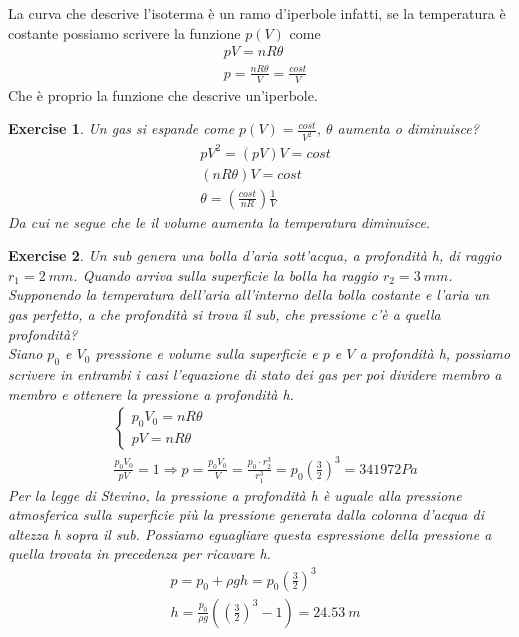 \documentclass[10pt,a4paper]{article}
\newtheorem{exercise}{Exercise}
\begin{document}
\FloatBarrier
 La curva che descrive l'isoterma è un ramo d'iperbole infatti, se la temperatura è costante possiamo scrivere la funzione $p(V)$ come
 \begin{align*} 
 	&p V  = nR\theta \\
 	&p = \frac{n R \theta}{V} = \frac{cost}{V}
 \end{align*} 
Che è proprio la funzione che descrive un'iperbole.
\begin{exercise}
 Un gas si espande come $p(V) = \frac{cost}{V^2}$, $\theta$ aumenta o diminuisce? 
 \begin{align*} 
 	&p V^2 = \left(p V \right) V = cost\\
 	&\left(n R \theta\right) V = cost\\
 	& \theta = \left(\frac{cost}{n R}\right)\frac{1}{V}
 \end{align*}  
Da cui ne segue che le il volume aumenta la temperatura diminuisce.
\end{exercise}
\begin{exercise}
Un sub genera una bolla d'aria sott'acqua, a profondità h, di raggio $r_1 = 2\ mm$. Quando arriva sulla superficie la bolla ha raggio $r_2 = 3\ mm$. Supponendo la temperatura dell'aria all'interno della bolla costante e l'aria un gas perfetto, a che profondità si trova il sub, che pressione c'è a quella profondità?\\
Siano $p_0$ e $V_0$ pressione e volume sulla superficie e $p$ e $V$ a profondità h, possiamo scrivere in entrambi i casi l'equazione di stato dei gas per poi dividere membro a membro e ottenere la pressione a profondità h. 
\begin{align*} 
&\begin{cases}
p_0 V_0 = n R \theta\\
pV = nR\theta
\end{cases}\\
&\frac{p_0 V_0}{p V}=1 \Rightarrow p = \frac{p_0 V_0}{V} = \frac{p_0 \cdot r_2^3}{r_1^3} = p_0 \left(\frac{3}{2}\right)^3 = 341972 Pa
\end{align*} 
Per la legge di Stevino, la pressione a profondità h è uguale alla pressione atmosferica sulla superficie più la pressione generata dalla colonna d'acqua di altezza h sopra il sub. Possiamo eguagliare questa espressione della pressione a quella trovata in precedenza per ricavare h.
\begin{align*} 
&p = p_0 + \rho g h = p_0 \left(\frac{3}{2}\right)^3\\
&h =\frac{p_0}{\rho g} \left(\left(\frac{3}{2}\right)^3 - 1\right) = 24.53\ m 
\end{align*} 
\end{exercise}
\end{document}
